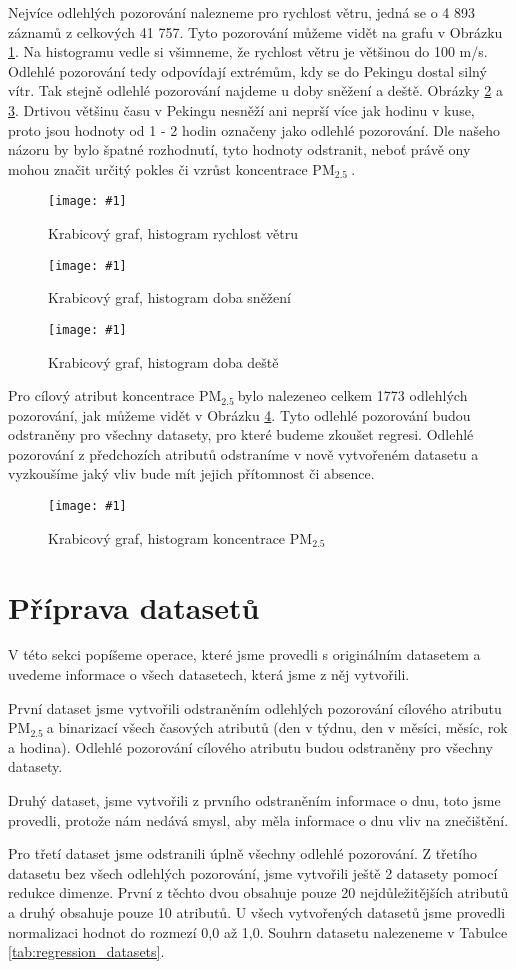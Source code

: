 \documentclass[a4paper,12pt]{article}
\newcommand{\pmQuant}[0]{$\text{PM}_{2.5}\:$}
\newcommand{\image}[4]{\begin{figure}[ht!] \centering \texttt{[image: \#1]} \caption{#2} \label{#3} \end{figure}}
\begin{document}
Nejvíce odlehlých pozorování nalezneme pro rychlost větru, jedná se o 4 893 záznamů z celkových 41 757.
Tyto pozorování můžeme vidět na grafu v Obrázku \ref{fig:wndspeed_analys}. Na histogramu vedle si všimneme,
že rychlost větru je většinou do 100 m/s. Odlehlé pozorování tedy odpovídají extrémům, kdy se do Pekingu dostal silný vítr.
Tak stejně odlehlé pozorování najdeme u doby sněžení a deště. Obrázky \ref{fig:hsnow_analys} a \ref{fig:hrain_analys}.
Drtivou většinu času v Pekingu nesněží ani neprší více jak hodinu v kuse, proto jsou hodnoty od 1 - 2 hodin označeny jako odlehlé 
pozorování. Dle našeho názoru by bylo špatné rozhodnutí, tyto hodnoty odstranit, neboť právě ony mohou značit
určitý pokles či vzrůst koncentrace \pmQuant .

\image{wndspd.pdf}{Krabicový graf, histogram rychlost větru}{fig:wndspeed_analys}{0.8}
\image{hsnow.pdf}{Krabicový graf, histogram doba sněžení}{fig:hsnow_analys}{0.8}
\image{hrain.pdf}{Krabicový graf, histogram doba deště}{fig:hrain_analys}{0.8}

Pro cílový atribut koncentrace \pmQuant bylo nalezeneo celkem 1773 odlehlých pozorování, jak můžeme vidět v Obrázku \ref{fig:pm25_analys}.
Tyto odlehlé pozorování budou odstraněny pro všechny datasety, pro které budeme zkoušet regresi.
Odlehlé pozorování z předchozích atributů odstraníme v nově vytvořeném datasetu a vyzkoušíme jaký vliv
bude mít jejich přítomnost či absence. 

\image{pm25.pdf}{Krabicový graf, histogram koncentrace \pmQuant}{fig:pm25_analys}{0.8}

\section{Příprava datasetů}
V této sekci popíšeme operace, které jsme provedli s originálním datasetem a uvedeme informace o všech datasetech, která jsme
z něj vytvořili. 

První dataset jsme vytvořili odstraněním odlehlých pozorování cílového atributu \pmQuant a binarizací všech časových atributů
(den v týdnu, den v měsíci, měsíc, rok a hodina). Odlehlé pozorování cílového atributu budou odstraněny pro všechny datasety.

Druhý dataset, jsme vytvořili z prvního odstraněním informace o dnu, toto jsme provedli, protože nám nedává smysl, aby měla informace
o dnu vliv na znečištění.

Pro třetí dataset jsme odstranili úplně všechny odlehlé pozorování. Z třetího datasetu bez všech odlehlých pozorování, 
jsme vytvořili ještě 2 datasety pomocí redukce dimenze. První z těchto
dvou obsahuje pouze 20 nejdůležitějších atributů a druhý obsahuje pouze 10 atributů.
U všech vytvořených datasetů jsme provedli normalizaci hodnot do rozmezí 0,0 až 1,0. 
Souhrn datasetu nalezeneme v Tabulce \ref{tab:regression_datasets}.
\end{document}
